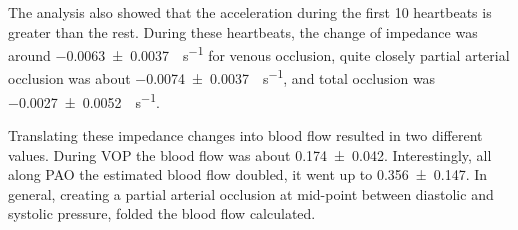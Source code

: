 The analysis also showed that the acceleration during the first 10 heartbeats is greater than the rest. During these heartbeats, the change of impedance was around \SI{-0.0063(00037)}{\Omega \per \second} for venous occlusion, quite closely partial arterial occlusion was about \SI{-0.0074(00037)}{\Omega \per \second}, and total occlusion was \SI{-0.0027(00052)}{\Omega \per \second}. 

Translating these impedance changes into blood flow resulted in two different values. During VOP the blood flow was about \SI{0.174(0042)}{\bfv}. Interestingly, all along PAO the estimated blood flow doubled, it went up to \SI{0.356(0147)}{\bfv}. In general, creating a partial arterial occlusion at mid-point between diastolic and systolic pressure, folded the blood flow calculated.  

